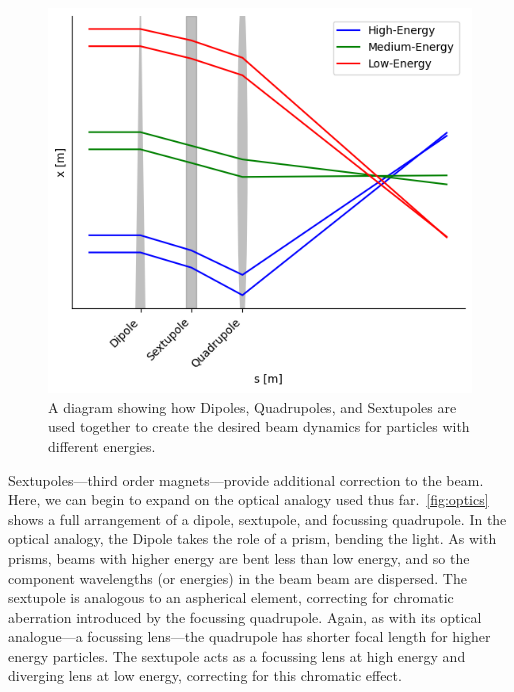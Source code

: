 \documentclass[11pt]{report}
\begin{document}
\begin{figure}
  \centering
  \includegraphics[width=0.6\linewidth]{optics-example.png}
  \caption{A diagram showing how Dipoles, Quadrupoles, and Sextupoles are used together to create the desired beam dynamics for particles with different energies.}\label{fig:optics}
\end{figure}

Sextupoles---third order magnets---provide additional correction to the beam. Here, we can begin to expand on the optical analogy used thus far.~\autoref{fig:optics} shows a full arrangement of a dipole, sextupole, and focussing quadrupole. In the optical analogy, the Dipole takes the role of a prism, bending the light. As with prisms, beams with higher energy are bent less than low energy, and so the component wavelengths (or energies) in the beam beam are dispersed. The sextupole is analogous to an aspherical element, correcting for chromatic aberration introduced by the focussing quadrupole. Again, as with its optical analogue---a focussing lens---the quadrupole has shorter focal length for higher energy particles. The sextupole acts as a focussing lens at high energy and diverging lens at low energy, correcting for this chromatic effect.

\end{document}
